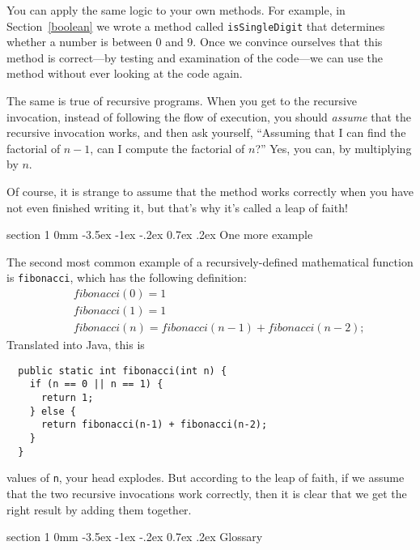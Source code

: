 \documentclass{book}
\makeatletter
\renewcommand{\section}{\@startsection 
    {section} {1} {0mm}%
    {-3.5ex \@plus -1ex \@minus -.2ex}%
    {0.7ex \@plus.2ex}%
    {\normalfont\Large\bfseries}}
\makeatother
\begin{document}
You can apply the same logic to your own methods.
For example, in Section~\ref{boolean} we wrote a method called
{\tt isSingleDigit} that determines whether a number is between
0 and 9.  Once we convince ourselves that this method
is correct---by testing and examination of the code---we can
use the method without ever looking at the code again.

The same is true of recursive programs.  When you get to
the recursive invocation, instead of following the flow of
execution, you should {\em assume} that the recursive invocation
works, and then ask yourself,
``Assuming that I can find the factorial of $n-1$, can I
compute the factorial of $n$?''  Yes, you can, by multiplying by $n$.

Of course, it is strange to assume that the method
works correctly when you have not even finished writing it,
but that's why it's called a leap of faith!


\section{One more example}
\label{factorial}

The second most common example of a recursively-defined
mathematical function is {\tt fibonacci}, which has the
following definition:
%
\begin{eqnarray*}
&& fibonacci(0) = 1 \\
&& fibonacci(1) = 1 \\
&& fibonacci(n) = fibonacci(n-1) + fibonacci(n-2);
\end{eqnarray*}
%
Translated into Java, this is

\begin{verbatim}
  public static int fibonacci(int n) {
    if (n == 0 || n == 1) {
      return 1;
    } else {
      return fibonacci(n-1) + fibonacci(n-2);
    }
  }
\end{verbatim}
values of {\tt n}, your head explodes.  But according to the leap of
faith, if we assume that the two recursive invocations work correctly, then
it is clear that we get the right result by adding them together.


\section{Glossary}
\end{document}
